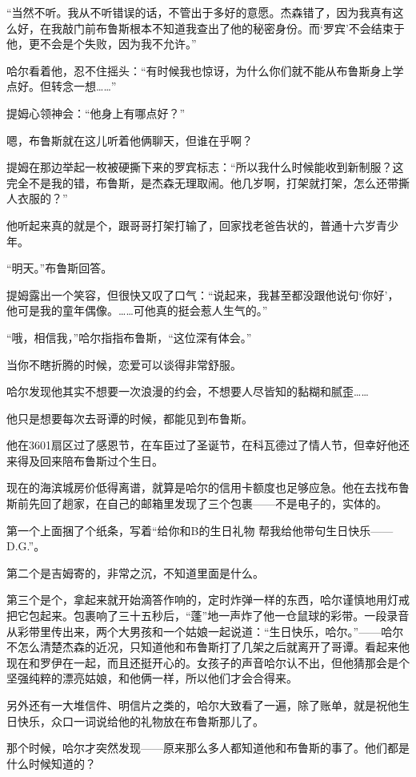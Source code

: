 \documentclass[../main]{subfiles}
\begin{document}
“当然不听。我从不听错误的话，不管出于多好的意愿。杰森错了，因为我真有这么好，在我敲门前布鲁斯根本不知道我查出了他的秘密身份。而`罗宾'不会结束于他，更不会是个失败，因为我不允许。”

哈尔看着他，忍不住摇头：“有时候我也惊讶，为什么你们就不能从布鲁斯身上学点好。但转念一想\ldots\ldots”

提姆心领神会：“他身上有哪点好？”

嗯，布鲁斯就在这儿听着他俩聊天，但谁在乎啊？

提姆在那边举起一枚被硬撕下来的罗宾标志：“所以我什么时候能收到新制服？这完全不是我的错，布鲁斯，是杰森无理取闹。他几岁啊，打架就打架，怎么还带撕人衣服的？”

他听起来真的就是个，跟哥哥打架打输了，回家找老爸告状的，普通十六岁青少年。

“明天。”布鲁斯回答。

提姆露出一个笑容，但很快又叹了口气：“说起来，我甚至都没跟他说句`你好'，他可是我的童年偶像。……可他真的挺会惹人生气的。”

“哦，相信我，”哈尔指指布鲁斯，“这位深有体会。”

当你不瞎折腾的时候，恋爱可以谈得非常舒服。

哈尔发现他其实不想要一次浪漫的约会，不想要人尽皆知的黏糊和腻歪……

他只是想要每次去哥谭的时候，都能见到布鲁斯。

他在3601扇区过了感恩节，在车臣过了圣诞节，在科瓦德过了情人节，但幸好他还来得及回来陪布鲁斯过个生日。

现在的海滨城房价低得离谱，就算是哈尔的信用卡额度也足够应急。他在去找布鲁斯前先回了趟家，在自己的邮箱里发现了三个包裹——不是电子的，实体的。

第一个上面捆了个纸条，写着“给你和B的生日礼物
帮我给他带句生日快乐——D.G.”。

第二个是吉姆寄的，非常之沉，不知道里面是什么。

第三个是个，拿起来就开始滴答作响的，定时炸弹一样的东西，哈尔谨慎地用灯戒把它包起来。包裹响了三十五秒后，“蓬”地一声炸了他一仓鼠球的彩带。一段录音从彩带里传出来，两个大男孩和一个姑娘一起说道：“生日快乐，哈尔。”——哈尔不怎么清楚杰森的近况，只知道他和布鲁斯打了几架之后就离开了哥谭。看起来他现在和罗伊在一起，而且还挺开心的。女孩子的声音哈尔认不出，但他猜那会是个坚强纯粹的漂亮姑娘，和他俩一样，所以他们才会合得来。

另外还有一大堆信件、明信片之类的，哈尔大致看了一遍，除了账单，就是祝他生日快乐，众口一词说给他的礼物放在布鲁斯那儿了。

那个时候，哈尔才突然发现——原来那么多人都知道他和布鲁斯的事了。他们都是什么时候知道的？
\end{document}
